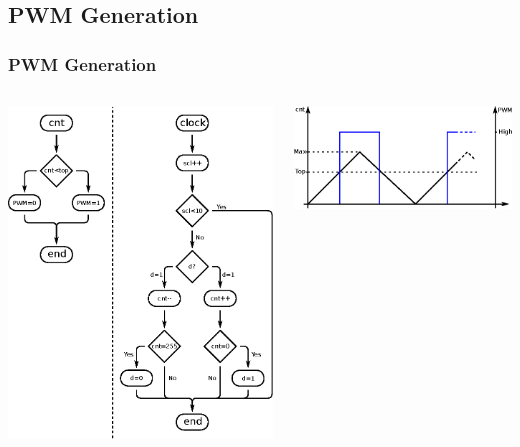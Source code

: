 \documentclass[mathserif]{beamer}
\begin{document}
\begin{frame}
	\section{PWM Generation}
	\frametitle{PWM Generation}
	\begin{columns}
		\begin{column}{.49\linewidth}
			\includegraphics[width=\linewidth]{graphics/pwmgenerator.eps}
		\end{column}
		\begin{column}{.49\linewidth}
			\includegraphics[width=\linewidth]{graphics/centeraligned.eps}
		\end{column}
	\end{columns}
\end{frame}
\end{document}
